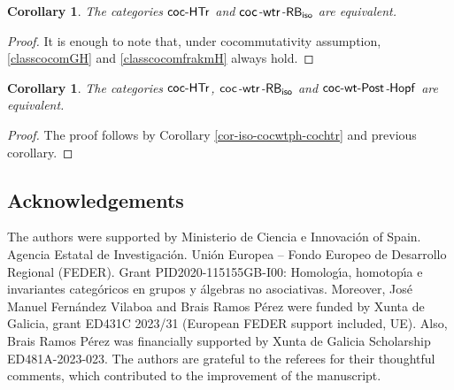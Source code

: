 \documentclass[pdftex]{sigma}
\numberwithin{equation}{section}
\newtheorem{Corollary}[Theorem]{Corollary}
\begin{document}
\begin{Corollary}
The categories ${\sf coc}\textnormal{-}{\sf HTr}$ and ${\sf coc}$-${\sf wtr}$-${\sf RB}_{{\sf iso}}$ are equivalent.
\end{Corollary}
\begin{proof}
It is enough to note that, under cocommutativity assumption, \eqref{classcocomGH} and \eqref{classcocomfrakmH} always hold.
\end{proof}

\begin{Corollary}
The categories ${\sf coc}\textnormal{-}{\sf HTr}$, ${\sf coc}$-${\sf wtr}$-${\sf RB}_{{\sf iso}}$ and $\sf{coc}\textnormal{-}{\sf wt}\textnormal{-}{\sf Post}$-$\sf{Hopf}$ are equivalent.
\end{Corollary}
\begin{proof}
The proof follows by Corollary \ref{cor-iso-cocwtph-cochtr} and previous corollary.
\end{proof}

\subsection*{Acknowledgements}

The authors were supported by Ministerio de Ciencia e Innovaci\'on of Spain. Agencia Estatal de Investigaci\'on. Uni\'on Europea -- Fondo Europeo de Desarrollo Regional (FEDER). Grant PID2020-115155GB-I00: Homolog\'{\i}a, homotop\'{\i}a e invariantes categ\'oricos en grupos y \'algebras no asociativas. Moreover, Jos\'e Manuel Fern\'andez Vilaboa and Brais Ramos P\'erez were funded by Xunta de Galicia, grant ED431C 2023/31 (European FEDER support included, UE). Also, Brais Ramos P\'erez was financially supported by Xunta de Galicia Scholarship ED481A-2023-023.
The authors are grateful to the referees for their thoughtful comments, which contributed to the improvement of the manuscript.
\end{document}
